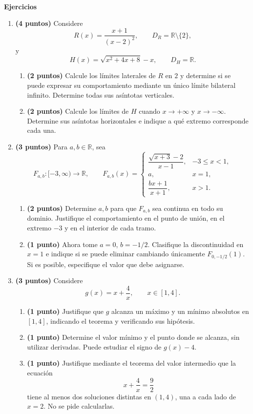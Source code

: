 \documentclass[10pt,a5paper]{article}
\begin{document}
\noindent\textbf{Ejercicios}
\begin{enumerate}
  \item \textbf{(4 puntos)} Considere
  \[
    R(x)=\frac{x+1}{(x-2)^2},\qquad
    D_R=\mathbb{R}\setminus\{2\},
  \]
  y
  \[
    H(x)=\sqrt{x^2+4x+8}-x,\qquad D_H=\mathbb{R}.
  \]
  \begin{enumerate}
    \item \textbf{(2 puntos)} Calcule los límites laterales de $R$ en $2$ y determine si se puede expresar su comportamiento mediante un único límite bilateral infinito. Determine todas sus asíntotas verticales.
    \item \textbf{(2 puntos)} Calcule los límites de $H$ cuando $x\to+\infty$ y $x\to-\infty$. Determine sus asíntotas horizontales e indique a qué extremo corresponde cada una.
  \end{enumerate}

  \item \textbf{(3 puntos)} Para $a,b\in\mathbb{R}$, sea
  \[
    F_{a,b}\colon[-3,\infty)\to\mathbb{R},\qquad
    F_{a,b}(x)=\begin{cases}
      \dfrac{\sqrt{x+3}-2}{x-1},&-3\leq x<1,\\[2mm]
      a,&x=1,\\
      \dfrac{bx+1}{x+1},&x>1.
    \end{cases}
  \]
  \begin{enumerate}
    \item \textbf{(2 puntos)} Determine $a,b$ para que $F_{a,b}$ sea continua en todo su dominio. Justifique el comportamiento en el punto de unión, en el extremo $-3$ y en el interior de cada tramo.
    \item \textbf{(1 punto)} Ahora tome $a=0$, $b=-1/2$. Clasifique la discontinuidad en $x=1$ e indique si se puede eliminar cambiando únicamente $F_{0,-1/2}(1)$. Si es posible, especifique el valor que debe asignarse.
  \end{enumerate}
  \item \textbf{(3 puntos)} Considere
  \[
    g(x)=x+\frac4x,\qquad x\in[1,4].
  \]
  \begin{enumerate}
    \item \textbf{(1 punto)} Justifique que $g$ alcanza un máximo y un mínimo absolutos en $[1,4]$, indicando el teorema y verificando sus hipótesis.
    \item \textbf{(1 punto)} Determine el valor mínimo y el punto donde se alcanza, sin utilizar derivadas. Puede estudiar el signo de $g(x)-4$.
    \item \textbf{(1 punto)} Justifique mediante el teorema del valor intermedio que la ecuación
    \[
      x+\frac4x=\frac92
    \]
    tiene al menos dos soluciones distintas en $(1,4)$, una a cada lado de $x=2$. No se pide calcularlas.
  \end{enumerate}
\end{enumerate}
\end{document}
